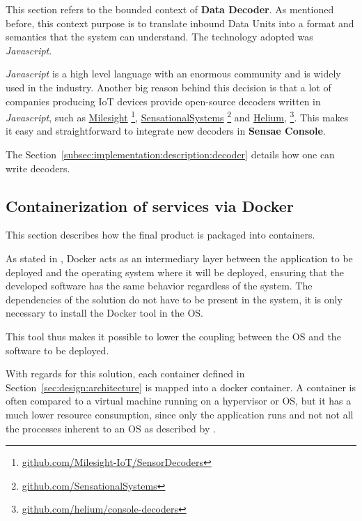 This section refers to the bounded context of \textbf{Data Decoder}. As mentioned before, this context purpose is to translate inbound Data Units into a format and semantics that the system can understand. The technology adopted was \textit{Javascript}.

\textit{Javascript} is a high level language with an enormous community and is widely used in the industry. Another big reason behind this decision is that a lot of companies producing \gls{IoT} devices provide open-source decoders written in \textit{Javascript}, such as \href{https://github.com/Milesight-IoT/SensorDecoders}{Milesight} \footnote{\href {https://github.com/Milesight-IoT/SensorDecoders}{github.com/Milesight-IoT/SensorDecoders}}, \href{https://github.com/SensationalSystems}{SensationalSystems} \footnote{\href {https://github.com/SensationalSystems}{github.com/SensationalSystems}} and \href{https://github.com/helium/console-decoders}{Helium}, \footnote{\href {https://github.com/helium/console-decoders}{github.com/helium/console-decoders}}. This makes it easy and straightforward to integrate new decoders in \textbf{Sensae Console}.

The Section~\ref{subsec:implementation:description:decoder} details how one can write decoders.

\subsection{Containerization of services via Docker}
\label{subsec:implementation:decisions:docker}

This section describes how the final product is packaged into containers.

As stated in , Docker acts as an intermediary layer between the application to be deployed and the operating system where it will be deployed, ensuring that the developed software has the same behavior regardless of the system. The dependencies of the solution do not have to be present in the system, it is only necessary to install the Docker tool in the \gls{OS}.

This tool thus makes it possible to lower the coupling between the \gls{OS} and the software to be deployed.

With regards for this solution, each container defined in Section~\ref{sec:design:architecture} is mapped into a docker container.
A container is often compared to a virtual machine running on a hypervisor or \gls{OS}, but it has a much lower resource consumption, since only the application runs and not not all the processes inherent to an \gls{OS} as described by \cite{bernstein2014containers}.

